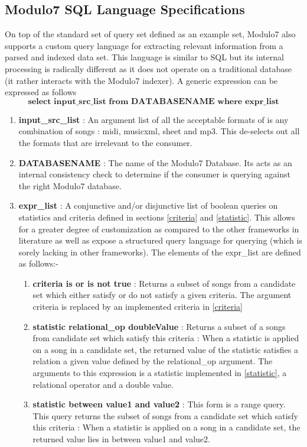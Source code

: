 \subsection{Modulo7 SQL Language Specifications} \label{m7sql}

\noindent On top of the standard set of query set defined as an example set, Modulo7 also supports a custom query language for extracting relevant information from a parsed and indexed data set. This language is similar to SQL but its internal processing is radically different as it does not operate on a traditional database (it rather interacts with the Modulo7 indexer). A generic expression can be expressed as follows
\begin{equation}
\textbf{select input\_src\_list  from DATABASENAME where expr\_list}
\end{equation}

\begin{enumerate}
\item \textbf{input\_src\_list} : An argument list of all the acceptable formats of is any combination of songs : midi, musicxml, sheet and mp3. This de-selects out all the formats that are irrelevant to the consumer. 

\item \textbf{DATABASENAME} : The name of the Modulo7 Database. Its acts as an internal consistency check to determine if the consumer is querying against the right Modulo7 database. 

\item \textbf{expr\_list} : A conjunctive and/or disjunctive list of boolean queries on statistics and criteria defined in sections \ref{criteria} and \ref{statistic}. This allows for a greater degree of customization as compared to the other frameworks in literature as well as expose a structured query language for querying (which is sorely lacking in other frameworks). The elements of the expr\_list are defined as follows:-

\begin{enumerate}
\item \textbf{criteria is or is not true} : Returns a subset of songs from a candidate set which either satisfy or do not satisfy a given criteria. The argument criteria is replaced by an implemented criteria in \ref{criteria}
\item \textbf{statistic relational\_op doubleValue} : Returns a subset of a songs from candidate set which satisfy this criteria : When a statistic is applied on a song in a candidate set, the returned value of the statistic satisfies a relation a given value defined by the relational\_op argument. The arguments to this expression is a statistic implemented in \ref{statistic}, a relational operator and a double value.
\item \textbf{statistic between value1 and value2} : This form is a range query. This query returns the subset of songs from a candidate set which satisfy this criteria : When a statistic is applied on a song in a candidate set, the returned value lies in between value1 and value2. 
\end{enumerate}
\end{enumerate}

